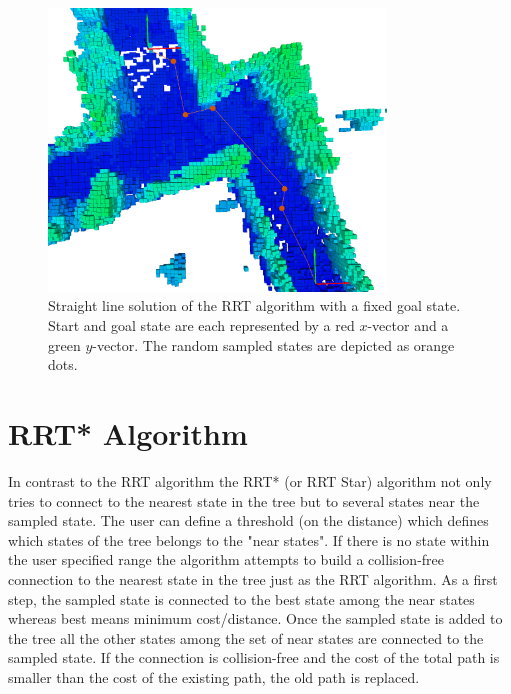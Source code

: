 \begin{figure}[H]
   \centering
   \includegraphics[trim = 50mm 0mm 30mm 0mm,clip,width=0.8\textwidth]{pics/smallGammaP.png}
   \caption{Straight line solution of the RRT algorithm with a fixed goal state. Start and goal state are each represented by a red $x$-vector and a green $y$-vector. The random sampled states are depicted as orange dots.}
   \label{pic:smallGamma}
\end{figure}



\section{RRT* Algorithm}\label{sec:RRTstar}

In contrast to the RRT algorithm the RRT* (or RRT Star) algorithm not only tries to connect to the nearest state in the tree but to several states near the sampled state. The user can define a threshold (on the distance) which defines which states of the tree belongs to the "near states". If there is no state within the user specified range the algorithm attempts to build a collision-free connection to the nearest state in the tree just as the RRT algorithm.  \newline
As a first step, the sampled state is connected to the best state among the near states whereas best means minimum cost/distance. Once the sampled state is added to the tree all the other states among the set of near states are connected to the sampled state. If the connection is collision-free and the cost of the total path is smaller than the cost of the existing path, the old path is replaced. \newline

